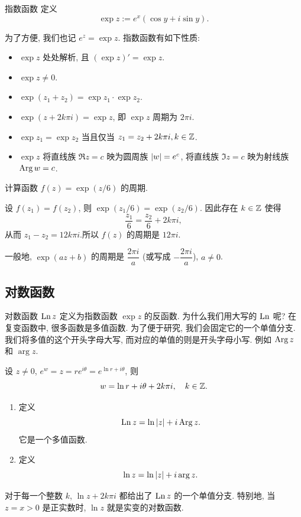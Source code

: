 \begin{definition}{指数函数}
定义
  \[\exp z:=e^x(\cos y+i\sin y).\]
\end{definition}
为了方便, 我们也记 \alert{$e^z=\exp z$}.
指数函数有如下性质:
\begin{itemize}
  \item $\exp z$ 处处解析, 且 $(\exp z)'=\exp z$.
  \item $\exp z\neq 0$.
  \item $\exp(z_1+z_2)=\exp z_1\cdot \exp z_2$.
  \item $\exp(z+2k\pi i)=\exp z$, 即 $\exp z$ 周期为 $2\pi i$.
  \item $\exp z_1=\exp z_2$ 当且仅当 $z_1=z_2+2k\pi i,k\in{\mathbb{Z}}$.
  \item $\exp z$ 将直线族 $\Re z=c$ 映为圆周族 $\left|w\right|=e^c$, 将直线族 $\Im z=c$ 映为射线族 $\operatorname{Arg} w=c$.
\end{itemize}

\begin{example}
  计算函数 $f(z)=\exp(z/6)$ 的周期.
\end{example}
\begin{solution}
  设 $f(z_1)=f(z_2)$, 则 $\exp(z_1/6)=\exp(z_2/6)$.
  {因此存在 $k\in{\mathbb{Z}}$ 使得
    \[\frac{z_1}6=\frac{z_2}6+2k\pi i,\]从而 $z_1-z_2=12k\pi i$.所以 $f(z)$ 的周期是 $12\pi i$.}
\end{solution}

一般地, $\exp(az+b)$ 的周期是 $\dfrac{2\pi i}a$ (或写成 $-\dfrac{2\pi i}a$), $a\neq 0$.


\subsection{对数函数}

对数函数 $\operatorname{Ln} z$ 定义为指数函数 $\exp z$ 的反函数.
为什么我们用大写的 $\operatorname{Ln}$ 呢? 
在复变函数中, 很多函数是多值函数.
为了便于研究, 我们会固定它的一个单值分支.
我们将多值的这个开头字母大写, 而对应的单值的则是开头字母小写.
例如 $\operatorname{Arg} z$ 和 $\arg z$.

设 $z\neq 0$, $e^w=z=re^{i\theta}=e^{\ln r+i\theta}$,
则
\[w=\ln r+i\theta+2k\pi i,\quad k\in{\mathbb{Z}}.\]
\begin{definition}[对数函数]
  \begin{enumerate}
    \item 定义
      \[\operatorname{Ln} z=\ln\left|z\right|+i\operatorname{Arg} z.\]
      它是一个多值函数.
    \item 定义
      \[\ln z=\ln\left|z\right|+i\arg z.\]
  \end{enumerate}
\end{definition}
对于每一个整数 $k$, $\ln z+2k\pi i$ 都给出了 $\operatorname{Ln} z$ 的一个单值分支.
特别地, 当 $z=x>0$ 是正实数时, $\ln z$ 就是实变的对数函数.

